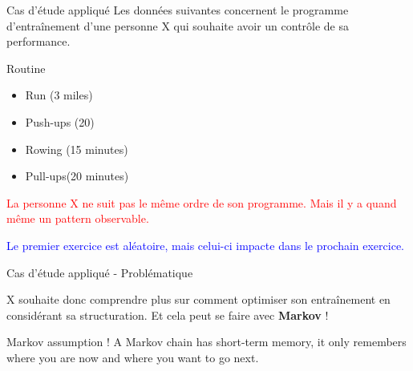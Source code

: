 \documentclass[aspectratio=169,xcolor=dvipsnames, t]{beamer}
\begin{document}
\begin{frame}{Cas d'étude appliqué}
	Les données suivantes concernent le programme d'entraînement d'une personne X qui souhaite avoir un contrôle de sa performance.
	
	\begin{block}{Routine}
		\begin{itemize}
			\item Run (3 miles)
			\item Push-ups (20)
			\item Rowing (15 minutes)
			\item Pull-ups(20 minutes)
		\end{itemize}
	\end{block}

	\textcolor{red}{La personne X ne suit pas le même ordre de son programme. Mais il y a quand même un pattern observable.}
	
	\textcolor{blue}{Le premier exercice est aléatoire, mais celui-ci impacte dans le prochain exercice.}
	
\end{frame}


\begin{frame}{Cas d'étude appliqué - Problématique}

	X souhaite donc comprendre plus sur comment optimiser son entraînement en considérant sa structuration.
	Et cela peut se faire avec \textbf{Markov} !
	
	\begin{alertblock}{Markov assumption !}
		A Markov chain has short-term memory, it only remembers where you are now and where you want to go next.
	\end{alertblock}
	
\end{frame}
\end{document}
